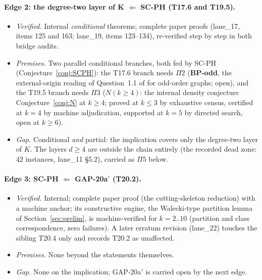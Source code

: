 \paragraph{Edge 2: the degree-two layer of K $\Leftarrow$ SC-PH (T17.6 and T19.5).}
\begin{itemize}[leftmargin=2em,itemsep=0.1em]
\item \emph{Verified.} Internal \emph{conditional} theorems; complete paper proofs
(lane\_17, items 125 and 163; lane\_19, items 123--134), re-verified step by step in
both bridge audits.
\item \emph{Premises.} Two parallel conditional branches, both fed by SC-PH
(Conjecture~\ref{conj:SCPH}): the T17.6 branch needs $\Pi2$ (\textbf{BP-odd}, the
external-origin reading of Question~1.1 of \cite{BP19} for odd-order graphs; open), and the
T19.5 branch needs $\Pi3$ (\textbf{$N(k\ge4)$}: the internal density conjecture
Conjecture~\ref{conj:N} at $k\ge4$; proved at $k\le3$ by exhaustive census, certified at
$k=4$ by machine adjudication, supported at $k=5$ by directed search, open at $k\ge6$).
\item \emph{Gap.} Conditional \emph{and} partial: the implication covers only the degree-two
layer of $K$. The layers $d\ge4$ are outside the chain entirely (the recorded dead zone:
$42$ instances, lane\_11 \S5.2), carried as $\Pi5$ below.
\end{itemize}

\paragraph{Edge 3: SC-PH $\Leftarrow$ GAP-20a$'$ (T20.2).}
\begin{itemize}[leftmargin=2em,itemsep=0.1em]
\item \emph{Verified.} Internal; complete paper proof (the cutting-skeleton reduction) with a
machine anchor; its constructive engine, the Walecki-type partition lemma of
Section~\ref{sec:prelim}, is machine-verified for $k=2..10$ (partition and class
correspondence, zero failures). A later erratum revision (lane\_22) touches the sibling
T20.4 only and records T20.2 as unaffected.
\item \emph{Premises.} None beyond the statements themselves.
\item \emph{Gap.} None on the implication; GAP-20a$'$ is carried open by the next edge.
\end{itemize}

